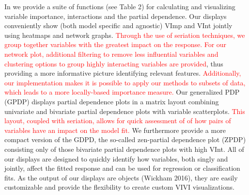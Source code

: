 In  we provide a suite of functions (see Table 2) for calculating and visualizing variable importance, interactions and the partial dependence. Our displays conveniently show (both model specific and agnostic) VImp and VInt jointly using heatmaps and network graphs. \textcolor{red}{Through the use of seriation techniques, we group together variables with the greatest impact on the response. For our network plot, additional filtering to remove less influential variables and clustering options to group highly interacting variables are provided}, thus providing a more informative picture identifying relevant features. \textcolor{red}{Additionally, our implementation makes it is possible to apply our methods to subsets of data, which leads to a more locally-based importance measure.} Our generalized PDP (GPDP) displays partial dependence plots in a matrix layout combining univariate and bivariate partial dependence plots with variable scatterplots. \textcolor{red}{This layout, coupled with seriation, allows for quick assessment of of how pairs of variables have an impact on the model fit.} We furthermore provide a more compact version of the GDPD, the so-called zen-partial dependence plot (ZPDP) consisting only of those bivariate partial dependence plots with high VInt. All of our displays are designed to quickly identify how variables, both singly and jointly, affect the fitted response and can be used for regression or classification fits. As the output of our displays are  objects (Wickham 2016), they are easily customizable and provide the flexibility to create custom VIVI visualizations.

